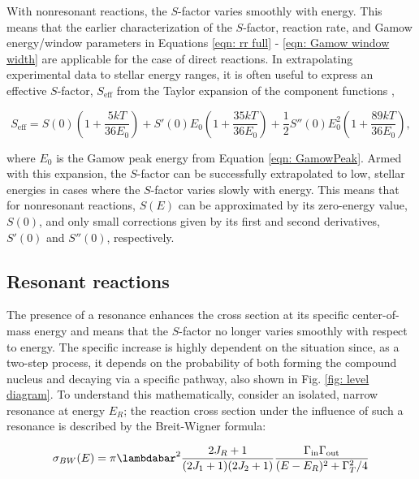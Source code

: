 With nonresonant reactions, the $S$-factor varies smoothly with energy. This means that the earlier characterization  of the $S$-factor, reaction rate, and Gamow energy/window parameters in Equations \ref{eqn: rr full} - 
\ref{eqn: Gamow window width} are applicable for the case of direct reactions. In extrapolating experimental data to stellar energy ranges, it is often useful to express an effective $S$-factor, $S_{\text{eff}}$ from the Taylor expansion of the component functions \cite{IliadisBook},

\begin{equation}
S_{\text{eff}} = S(0) \left( 1 + \dfrac{5 k T}{36 E_{0}}   \right) + S'(0) E_{0} \left( 1 + \dfrac{35 k T}{36 E_{0}}   \right)  + \dfrac{1}{2} S''(0) E_{0}^{2} \left( 1 + \dfrac{89 k T}{36 E_{0}}   \right),
\label{eqn: Seff}
\end{equation}

\noindent where $E_{0}$ is the Gamow peak energy from Equation \ref{eqn: GamowPeak}. Armed with this expansion, the $S$-factor can be successfully extrapolated to low, stellar energies in cases where the $S$-factor varies slowly with energy. This means that for nonresonant reactions, $S(E)$ can be approximated by its zero-energy value, $S(0)$, and only small corrections given by its first and second derivatives, $S'(0)$ and $S''(0)$, respectively. 




\subsection{Resonant reactions}

The presence of a resonance enhances the cross section at its specific center-of-mass energy and means that the $S$-factor no longer varies smoothly with respect to energy. The specific increase is highly dependent on the situation since, as a two-step process, it depends on the probability of both forming the compound nucleus and decaying via a specific pathway, also shown in Fig. \ref{fig: level diagram}. To understand this mathematically, consider an isolated, narrow resonance at energy $E_{R}$; the reaction cross section under the influence of such a resonance is described by the Breit-Wigner formula:

\begin{equation}
\label{eqn: BreitWigner}
\sigma_{BW}(E) = \pi \lambdabar^{2} \frac{2J_R+1}{(2J_1+1)(2J_2+1)}\frac{\Gamma_\mathrm{in}\Gamma_\mathrm{out}}{(E-E_{R})^2+\Gamma_{T}^2/4}
\end{equation}

